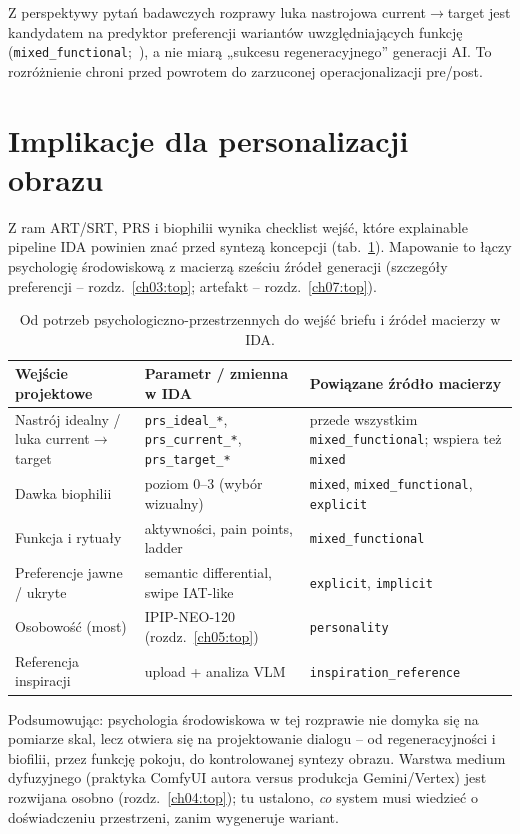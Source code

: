 Z perspektywy pytań badawczych rozprawy luka nastrojowa current$\rightarrow$target jest kandydatem na predyktor preferencji wariantów uwzględniających funkcję (\texttt{mixed\_functional};~), a nie miarą „sukcesu regeneracyjnego” generacji AI.
To rozróżnienie chroni przed powrotem do zarzuconej operacjonalizacji pre/post.

\section{Implikacje dla personalizacji obrazu}
\label{ch02:sec:implikacje}

Z ram ART/SRT, PRS i biophilii wynika checklist wejść, które explainable pipeline IDA powinien znać przed syntezą koncepcji (tab.~\ref{tab:ch02:inputs-brief}).
Mapowanie to łączy psychologię środowiskową z macierzą sześciu źródeł generacji (szczegóły preferencji -- rozdz.~\ref{ch03:top}; artefakt -- rozdz.~\ref{ch07:top}).

\begin{table}[htbp]
  \centering
  \caption{Od potrzeb psychologiczno-przestrzennych do wejść briefu i źródeł macierzy w IDA.}
  \label{tab:ch02:inputs-brief}
  \begin{tabular}{@{}p{}p{}p{}@{}}
    \toprule
    Wejście projektowe & Parametr / zmienna w IDA & Powiązane źródło macierzy \\
    \midrule
    Nastrój idealny / luka current$\rightarrow$target
      & \texttt{prs\_ideal\_*}, \texttt{prs\_current\_*}, \texttt{prs\_target\_*}
      & przede wszystkim \texttt{mixed\_functional}; wspiera też \texttt{mixed} \\
    Dawka biophilii
      & poziom 0--3 (wybór wizualny)
      & \texttt{mixed}, \texttt{mixed\_functional}, \texttt{explicit} \\
    Funkcja i rytuały
      & aktywności, pain points, ladder
      & \texttt{mixed\_functional} \\
    Preferencje jawne / ukryte
      & semantic differential, swipe IAT-like
      & \texttt{explicit}, \texttt{implicit} \\
    Osobowość (most)
      & IPIP-NEO-120 (rozdz.~\ref{ch05:top})
      & \texttt{personality} \\
    Referencja inspiracji
      & upload + analiza VLM
      & \texttt{inspiration\_reference} \\
    \bottomrule
  \end{tabular}
\end{table}

Podsumowując: psychologia środowiskowa w tej rozprawie nie domyka się na pomiarze skal, lecz otwiera się na projektowanie dialogu -- od regeneracyjności i biofilii, przez funkcję pokoju, do kontrolowanej syntezy obrazu.
Warstwa medium dyfuzyjnego (praktyka ComfyUI autora versus produkcja Gemini/Vertex) jest rozwijana osobno (rozdz.~\ref{ch04:top}); tu ustalono, \emph{co} system musi wiedzieć o doświadczeniu przestrzeni, zanim wygeneruje wariant.
